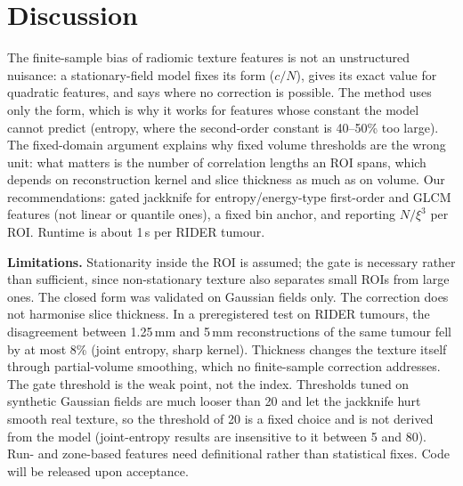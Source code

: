 \documentclass[runningheads]{llncs}
\begin{document}
\section{Discussion}
The finite-sample bias of radiomic texture features is not an unstructured nuisance: a stationary-field model fixes its form ($c/N$), gives its exact value for quadratic features, and says where no correction is possible. The method uses only the form, which is why it works for features whose constant the model cannot predict (entropy, where the second-order constant is 40--50\% too large). The fixed-domain argument explains why fixed volume thresholds are the wrong unit: what matters is the number of correlation lengths an ROI spans, which depends on reconstruction kernel and slice thickness as much as on volume. Our recommendations: gated jackknife for entropy/energy-type first-order and GLCM features (not linear or quantile ones), a fixed bin anchor, and reporting $N/\xi^3$ per ROI. Runtime is about 1\,s per RIDER tumour.

\noindent\textbf{Limitations.} Stationarity inside the ROI is assumed; the gate is necessary rather than sufficient, since non-stationary texture also separates small ROIs from large ones. The closed form was validated on Gaussian fields only. The correction does not harmonise slice thickness. In a preregistered test on RIDER tumours, the disagreement between 1.25\,mm and 5\,mm reconstructions of the same tumour fell by at most 8\% (joint entropy, sharp kernel). Thickness changes the texture itself through partial-volume smoothing, which no finite-sample correction addresses. The gate threshold is the weak point, not the index. Thresholds tuned on synthetic Gaussian fields are much looser than 20 and let the jackknife hurt smooth real texture, so the threshold of 20 is a fixed choice and is not derived from the model (joint-entropy results are insensitive to it between 5 and 80). Run- and zone-based features need definitional rather than statistical fixes. Code will be released upon acceptance.



\end{document}
